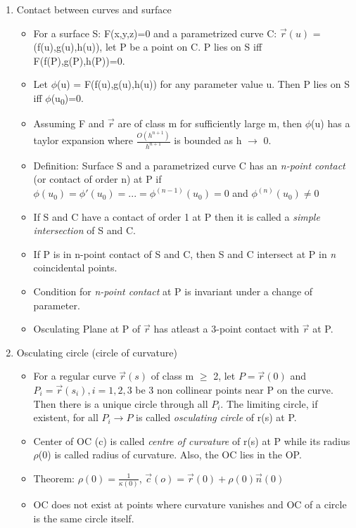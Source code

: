 \documentclass[11pt]{article}
\begin{document}
\begin{enumerate}
\begin{itemize}
\end{itemize}
\item Contact between curves and surface
\label{sec:org15fda41}
\begin{itemize}
\item For a surface S: F(x,y,z)=0 and a parametrized curve C: \(\vec{r}(u)\) = (f(u),g(u),h(u)), let P be a point on C. P lies on S iff F(f(P),g(P),h(P))=0.
\item Let \(\phi\)(u) = F(f(u),g(u),h(u)) for any parameter value u. Then P lies on S iff \(\phi\)(u\textsubscript{0})=0.
\item Assuming F and \(\vec{r}\) are of class m for sufficiently large m, then \(\phi\)(u) has a taylor expansion where \(\frac{O(h^{n+1})}{h^{n+1}}\) is bounded as h \(\rightarrow\) 0.
\item Definition: Surface S and a parametrized curve C has an \emph{n-point contact} (or contact of order n) at P if \(\phi(u_{0}) = \phi'(u_{0}) = ... = \phi^{(n-1)}(u_{0}) = 0\) and \(\phi^{(n)}(u_{0})\neq 0\)
\item If S and C have a contact of order 1 at P then it is called a \emph{simple intersection} of S and C.
\item If P is in n-point contact of S and C, then S and C intersect at P in \emph{n} coincidental points.
\item Condition for \emph{n-point contact} at P is invariant under a change of parameter.
\item Osculating Plane at P of \(\vec{r}\) has atleast a 3-point contact with \(\vec{r}\) at P.
\end{itemize}
\item Osculating circle (circle of curvature)
\label{sec:org29b498f}
\begin{itemize}
\item For a regular curve \(\vec{r}(s)\) of class m \(\ge\) 2, let \(P=\vec{r}(0)\) and \(P_{i}=\vec{r}(s_{i}), i=1,2,3\) be 3 non collinear points near P on the curve. Then there is a unique circle through all \(P_{i}\). The limiting circle, if existent, for all \(P_{i} \rightarrow P\) is called \emph{osculating circle} of r(s) at P.
\item Center of OC (c) is called \emph{centre of curvature} of r(s) at P while its radius \(\rho\)(0) is called radius of curvature. Also, the OC lies in the OP.
\item Theorem: \(\rho(0)=\frac{1}{\kappa(0)}\), \(\vec{c}(o)= \vec{r}(0)+\rho(0)\vec{n}(0)\)
\item OC does not exist at points where curvature vanishes and OC of a circle is the same circle itself.

\end{itemize}
\end{enumerate}
\end{document}
